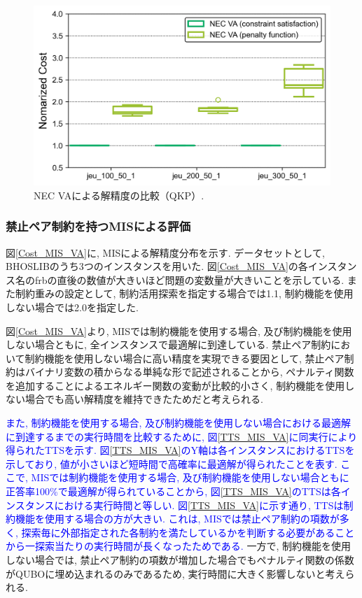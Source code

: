 \documentclass[submit,techrep,noauthor]{ipsj}
\begin{document}
\begin{figure}[tb]
\centering
\includegraphics[bb=0 0 700 230, width=15cm]{Cost_QKP_VA.png}
\caption{NEC VAによる解精度の比較（QKP）.}
\label{Cost_QKP_VA}
\end{figure}

\subsubsection{禁止ペア制約を持つMISによる評価}
図\ref{Cost_MIS_VA}に, MISによる解精度分布を示す. データセットとして, BHOSLIB\cite{mislib}のうち3つのインスタンスを用いた. 図\ref{Cost_MIS_VA}の各インスタンス名のfrbの直後の数値が大きいほど問題の変数量が大きいことを示している. また制約重みの設定として, 制約活用探索を指定する場合では1.1, 制約機能を使用しない場合では2.0を指定した.

図\ref{Cost_MIS_VA}より, MISでは制約機能を使用する場合, 及び制約機能を使用しない場合ともに, 全インスタンスで最適解に到達している. 禁止ペア制約において制約機能を使用しない場合に高い精度を実現できる要因として, 禁止ペア制約はバイナリ変数の積からなる単純な形で記述されることから, ペナルティ関数を追加することによるエネルギー関数の変動が比較的小さく, 制約機能を使用しない場合でも高い解精度を維持できたためだと考えられる.

\textcolor{blue}{また, 制約機能を使用する場合, 及び制約機能を使用しない場合における最適解に到達するまでの実行時間を比較するために, 図\ref{TTS_MIS_VA}に同実行により得られたTTSを示す. 図\ref{TTS_MIS_VA}のY軸は各インスタンスにおけるTTSを示しており, 値が小さいほど短時間で高確率に最適解が得られたことを表す. ここで, MISでは制約機能を使用する場合, 及び制約機能を使用しない場合ともに正答率100\%で最適解が得られていることから, 図\ref{TTS_MIS_VA}のTTSは各インスタンスにおける実行時間と等しい. 図\ref{TTS_MIS_VA}に示す通り, TTSは制約機能を使用する場合の方が大きい. これは, MISでは禁止ペア制約の項数が多く, 探索毎に外部指定された各制約を満たしているかを判断する必要があることから一探索当たりの実行時間が長くなったためである.} 一方で, 制約機能を使用しない場合では, 禁止ペア制約の項数が増加した場合でもペナルティ関数の係数がQUBOに埋め込まれるのみであるため, 実行時間に大きく影響しないと考えられる.
\end{document}
